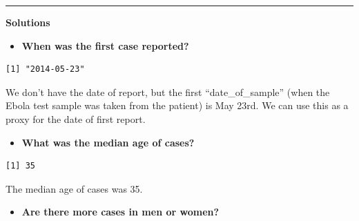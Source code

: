 \documentclass[
  letterpaper,
  DIV=11,
  numbers=noendperiod]{scrreprt}
\newenvironment{Shaded}{\begin{snugshade}}{\end{snugshade}}
\newcommand{\AttributeTok}[1]{\textcolor[rgb]{0.40,0.45,0.13}{#1}}
\newcommand{\FunctionTok}[1]{\textcolor[rgb]{0.28,0.35,0.67}{#1}}
\newcommand{\NormalTok}[1]{\textcolor[rgb]{0.00,0.23,0.31}{#1}}
\newcommand{\SpecialCharTok}[1]{\textcolor[rgb]{0.37,0.37,0.37}{#1}}
\providecommand{\tightlist}{%
  \setlength{\itemsep}{0pt}\setlength{\parskip}{0pt}}\usepackage{longtable,booktabs,array}
\begin{document}
\begin{center}\rule{0.5\linewidth}{0.5pt}\end{center}

\textbf{Solutions}

\begin{itemize}
\tightlist
\item
  \textbf{When was the first case reported?}
\end{itemize}

\begin{Shaded}
\end{Shaded}

\begin{verbatim}
[1] "2014-05-23"
\end{verbatim}

We don't have the date of report, but the first ``date\_of\_sample''
(when the Ebola test sample was taken from the patient) is May 23rd. We
can use this as a proxy for the date of first report.

\begin{itemize}
\tightlist
\item
  \textbf{What was the median age of cases?}
\end{itemize}

\begin{Shaded}
\end{Shaded}

\begin{verbatim}
[1] 35
\end{verbatim}

The median age of cases was 35.

\begin{itemize}
\tightlist
\item
  \textbf{Are there more cases in men or women?}
\end{itemize}

\begin{Shaded}
\end{Shaded}
\end{document}
